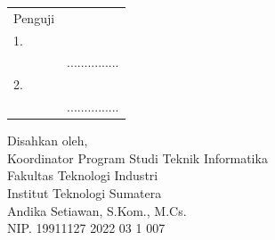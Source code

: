 \begin{center}
\begin{tabular}{ m{0.5cm}  m{} >{\centering\arraybackslash}m{}}
		\multicolumn{2}{c}{\hspace*{70pt}Penguji} & \multicolumn{1}{c}{} \\[2pt]
		1. & \printnamapengujia & \\
		& \printnippengujia & ............... \\[4pt]
		2. & \printnamapengujib & \\
		& \printnippengujib & ............... \\
    \end{tabular}

	\begin{center}
		\fontsize{10pt}{10pt}
        \vspace{0.45cm}
		Disahkan oleh,\\
		Koordinator Program Studi Teknik Informatika\\
		Fakultas Teknologi Industri\\
		Institut Teknologi Sumatera
		\vspace{1.8cm}\\
		Andika Setiawan, S.Kom., M.Cs. \\ %
		NIP. 19911127 2022 03 1 007 \\
	\end{center}
	\vfill

\end{center}
\clearpage